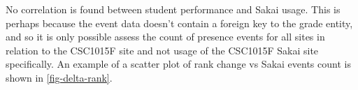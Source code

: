 No correlation is found between student performance and Sakai usage. This is perhaps because the event data doesn't contain a foreign key to the grade entity, and so it is only possible assess the count of presence events for all sites in relation to the CSC1015F site and not usage of the CSC1015F Sakai site specifically. An example of a scatter plot of rank change vs Sakai events count is shown in \ref{fig-delta-rank}.




